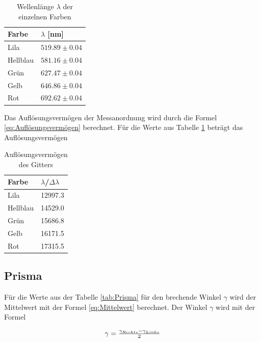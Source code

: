 \documentclass[12pt,a4paper,twoside]{article}
\begin{document}
\begin{table}[H]
    \centering
    \caption{Wellenlänge $\lambda$ der einzelnen Farben}
    \label{tab:wellenlänge gitter}
    \begin{tabular}{| l | l |}
        \hline
        Farbe & $\lambda$ [nm] \\
        \hline
        Lila        & $ 519.89 \pm 0.04 $ \\
        Hellblau    & $ 581.16 \pm 0.04 $ \\
        Grün        & $ 627.47 \pm 0.04 $ \\
        Gelb        & $ 646.86 \pm 0.04 $ \\
        Rot         & $ 692.62 \pm 0.04 $ \\
        \hline
    \end{tabular}
\end{table}

\noindent
Das Auflösungsvermögen der Messanordnung wird durch die Formel \ref{eq:Auflösungsvermögen} berechnet. 
Für die Werte aus Tabelle \ref{tab:wellenlänge gitter} beträgt das Auflösungsvermögen

\begin{table}[H]
    \centering
    \caption{Auflösungsvermögen des Gitters}
    \label{tab:Auflösungsvermögen gitter}
    \begin{tabular}{| l | l |}
        \hline
        Farbe & $\lambda$/$\Delta \lambda$ \\
        \hline
        Lila        &  12997.3\\
        Hellblau    &  14529.0\\
        Grün        &  15686.8\\
        Gelb        &  16171.5\\
        Rot         &  17315.5\\
        \hline
    \end{tabular}
\end{table}

\subsection{Prisma}
Für die Werte aus der Tabelle \ref{tab:Prisma} für den brechende Winkel $\gamma$ wird der Mittelwert mit der Formel \ref{eq:Mittelwert} berechnet. 
Der Winkel $\gamma$ wird mit der Formel

\begin{equation}
    \label{eq:formel für prismawix}
    \centerline{$\gamma = \frac{\gamma_{Rechts} - \gamma_{Links}}{2}$}
\end{equation}
\end{document}
